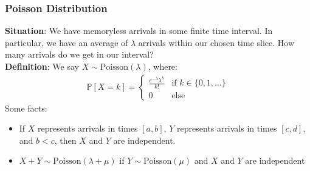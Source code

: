 \documentclass{beamer}
\begin{document}
\begin{frame}
    \frametitle{Poisson Distribution}
    {\bf Situation}: We have memoryless arrivals in some finite time interval. In particular, we have an average of $\lambda$ arrivals within our chosen time slice. How many arrivals do we get in our interval?\\
    {\bf Definition}: We say $X\sim\text{Poisson}(\lambda)$, where:
    \begin{gather*}
        \mathbb{P}[X=k]=\begin{cases}
            \frac{e^{-\lambda}\lambda^k}{k!}&\text{if }k\in\{0,1,\dots\}\\
            0&\text{else}
        \end{cases}
    \end{gather*}
    Some facts:
    \begin{itemize}
        \item If $X$ represents arrivals in times $[a,b]$, $Y$ represents arrivals in times $[c,d]$, and $b<c$, then $X$ and $Y$ are independent.
        \item $X+Y\sim\text{Poisson}(\lambda+\mu)$ if $Y\sim\text{Poisson}(\mu)$ and $X$ and $Y$ are independent
    \end{itemize}
\end{frame}
\end{document}
